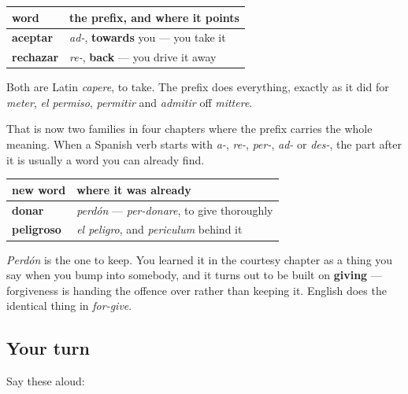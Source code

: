 \begin{grammarlens}[title={Grammar Lens: one verb of taking, pointed two ways}]
\noindent
\begin{tabularx}{\linewidth}{@{}>{\raggedright\arraybackslash}X>{\raggedright\arraybackslash}X@{}}
\toprule
\textbf{word} & \textbf{the prefix, and where it points} \\
\midrule
\textbf{aceptar} & \emph{ad-}, \textbf{towards} you — you take it \\
\textbf{rechazar} & \emph{re-}, \textbf{back} — you drive it away \\
\bottomrule
\end{tabularx}

Both are Latin \emph{capere}, to take. The prefix does everything, exactly as it did for \emph{meter}, \emph{el permiso}, \emph{permitir} and \emph{admitir} off \emph{mittere}.

That is now two families in four chapters where the prefix carries the whole meaning. When a Spanish verb starts with \emph{a-}, \emph{re-}, \emph{per-}, \emph{ad-} or \emph{des-}, the part after it is usually a word you can already find.
\end{grammarlens}

\begin{grammarlens}[title={Grammar Lens: two words hiding in your earliest vocabulary}]
\noindent
\begin{tabularx}{\linewidth}{@{}>{\raggedright\arraybackslash}X>{\raggedright\arraybackslash}X@{}}
\toprule
\textbf{new word} & \textbf{where it was already} \\
\midrule
\textbf{donar} & \emph{perdón} — \emph{per-donare}, to give thoroughly \\
\textbf{peligroso} & \emph{el peligro}, and \emph{periculum} behind it \\
\bottomrule
\end{tabularx}

\emph{Perdón} is the one to keep. You learned it in the courtesy chapter as a thing you say when you bump into somebody, and it turns out to be built on \textbf{giving} — forgiveness is handing the offence over rather than keeping it. English does the identical thing in \emph{for-give}.
\end{grammarlens}

\subsection*{Your turn}
Say these aloud:

